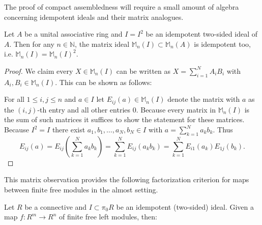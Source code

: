\documentclass[a4paper,10pt, oneside]{amsart}
\begin{document}
The proof of compact assembledness will require a small amount of algebra concerning idempotent ideals and their matrix analogues.
	\begin{lem}\label{matrixlem1}
		Let $A$ be a unital associative ring and $I=I^2$ be an idempotent two-sided ideal of $A$. Then for any $n\in\mathbb{N}$, the matrix ideal $\mathbb{M}_n(I)\subset \mathbb{M}_n(A)$ is idempotent too, i.e. $\mathbb{M}_n(I)=\mathbb{M}_n(I)^2$.
	\end{lem}
	\begin{proof}
		We claim every $X \in \mathbb{M}_n(I)$ can be written as $X=\sum_{i=1}^N A_i B_i$ with $A_i, B_i \in \mathbb{M}_n(I)$. This can be shown as follows:
		
		For all $1 \leq i, j \leq n$ and $a \in I$ let $E_{i j}(a) \in \mathbb{M}_n(I)$ denote the matrix with $a$ as the $(i, j)$-th entry and all other entries $0$. Because every matrix in $\mathbb{M}_n(I)$ is the sum of such matrices it suffices to show the statement for these matrices. Because $I^2=I$ there exist $a_1, b_1, \ldots, a_N, b_N \in I$ with $a=\sum_{k=1}^N a_k b_k$. Thus
		$$
		E_{i j}(a)=E_{i j}\left(\sum_{k=1}^N a_k b_k\right)=\sum_{k=1}^N E_{i j}\left(a_k b_k\right)=\sum_{k=1}^N E_{i 1}\left(a_k\right) E_{1 j}\left(b_k\right) .
		$$
	\end{proof}
	This matrix observation provides the following factorization criterion for maps between finite free modules in the almost setting.
	\begin{lem}\label{factorize}
		Let $R$ be a connective \eonering and $I\subset \pi_0R$ be an idempotent (two-sided) ideal. Given a map $f:R^m\to R^n$ of finite free left modules, then:
	\end{lem}
\end{document}
